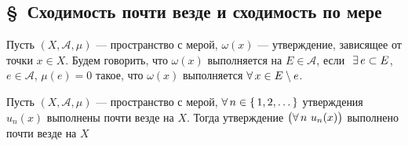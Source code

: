 \subsection*{\S\ Сходимость почти везде и сходимость по мере}

\begin{opr}
	Пусть $(X, \mathcal A, \mu)$ --- пространство с мерой, $\omega(x)$ --- утверждение, зависящее от точки $x \in X$. Будем говорить, что $\omega(x)$ выполняется  на $E \in \mathcal A$, если$\E e \subset E$, $e \in \mathcal A$, $\mu(e) = 0$ такое, что $\omega(x)$ выполняется $\forall \, x \in E \setminus e$.
\end{opr}

\begin{zam}[https://www.youtube.com/live/3LvgYceATKY?si=Y10776hYpa0q9DXw&t=10987]
	Пусть $(X, \mathcal A, \mu)$ --- пространство с мерой, $\forall \, n \in \{\, 1, 2, \ldots\,\}$ утверждения $u_n(x)$ выполнены почти везде на $X$. Тогда утверждение $\bigl(\A n\ u_n(x)\bigr)$ выполнено почти везде на $X$ 
\end{zam}


